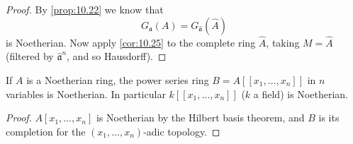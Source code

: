 \begin{proof}
By \eqref{prop:10.22} we know that
\[
G_{\mathfrak{a}}(A) = G_{\hat{\mathfrak{a}}}(\hat{A})
\]
is Noetherian. Now apply \eqref{cor:10.25} to the complete ring $\hat{A}$, taking $M = \hat{A}$ (filtered by $\hat{\mathfrak{a}}^n$, and so Hausdorff).
\end{proof}

\begin{corollary}\label{cor:10.27}
If $A$ is a Noetherian ring, the power series ring $B = A[[x_1, \ldots, x_n]]$ in $n$ variables is Noetherian. In particular $k[[x_1, \ldots, x_n]]$ ($k$ a field) is Noetherian.
\end{corollary}

\begin{proof}
$A[x_1, \ldots, x_n]$ is Noetherian by the Hilbert basis theorem, and $B$ is its completion for the $(x_1, \ldots, x_n)$-adic topology.
\end{proof}


